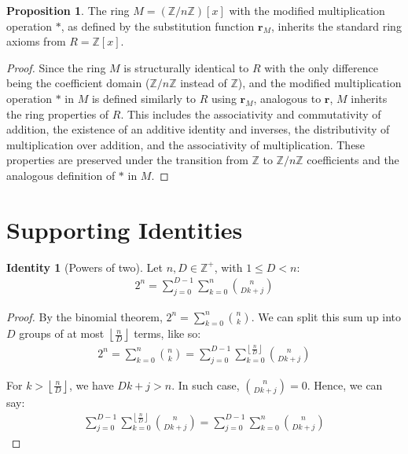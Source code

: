 \documentclass{article}
\theoremstyle{plain}
\theoremstyle{definition}
\newtheorem{identity}{Identity}
\newtheorem{proposition}{Proposition}
\newcommand{\floor}[1]{\left\lfloor #1 \right\rfloor}
\newcommand{\redu}{\textbf{r}}
\newcommand{\Z}{\mathbb{Z}}
\newcommand{\Rx}{R}
\newcommand{\Mx}{M}
\begin{document}
\begin{proposition} \label{proposition:modularring:1}
The ring \( \Mx = (\Z/n\Z)[x] \) with the modified multiplication operation \(\ast\), as defined by the substitution function \(\redu_M\), inherits the standard ring axioms from \( R = \Z[x] \).
\end{proposition}
\begin{proof}
Since the ring \( \Mx \) is structurally identical to \( \Rx \) with the only difference being the coefficient domain (\(\Z/n\Z\) instead of \(\Z\)), and the modified multiplication operation \(\ast\) in \( \Mx \) is defined similarly to \( \Rx \) using \(\redu_M\), analogous to \(\redu\), \( \Mx \) inherits the ring properties of \( \Rx \). This includes the associativity and commutativity of addition, the existence of an additive identity and inverses, the distributivity of multiplication over addition, and the associativity of multiplication. These properties are preserved under the transition from \(\Z\) to \(\Z/n\Z\) coefficients and the analogous definition of \(\ast\) in \( \Mx \).
\end{proof}

\section{Supporting Identities}

\begin{identity}[Powers of two] \label{identity:powersoftwobinomialgroups}
Let $n, D \in \Z^+$, with $1 \leq D < n$:
\begin{align}
    2^n = \sum_{j=0}^{D-1} \sum_{k=0}^{n} \binom{n}{D k + j}
\end{align}
\end{identity}
\begin{proof}
    By the binomial theorem, $2^n = \sum_{k=0}^{n} \binom{n}{k}$. We can split this sum up into $D$ groups of at most $\floor{\frac{n}{D}}$ terms, like so:
    \begin{align}
        2^n = \sum_{k=0}^{n} \binom{n}{k} = \sum_{j=0}^{D-1} \sum_{k=0}^{\floor{\frac{n}{D}}} \binom{n}{D k + j}
    \end{align}

    For $k > \floor{\frac{n}{D}}$, we have $D k + j > n$. In such case, $\binom{n}{D k + j} = 0$. Hence, we can say:
    \begin{align}
        \sum_{j=0}^{D-1} \sum_{k=0}^{\floor{\frac{n}{D}}} \binom{n}{D k + j} = \sum_{j=0}^{D-1} \sum_{k=0}^{n} \binom{n}{D k + j}
    \end{align}
\end{proof}
\end{document}

